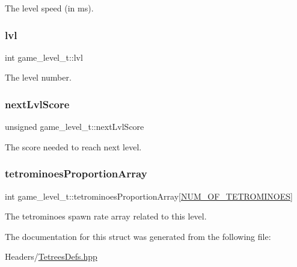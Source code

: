 The level speed (in ms). \mbox{\label{structgame__level__t_ab80383a9c51e3ad25cda4df0a7df8df2}} 
\subsubsection{\texorpdfstring{lvl}{lvl}}
{\footnotesize\ttfamily int game\+\_\+level\+\_\+t\+::lvl}

The level number. \mbox{\label{structgame__level__t_a9f5f86c9c90bebdd20950d74bf2dd450}} 
\subsubsection{\texorpdfstring{next\+Lvl\+Score}{nextLvlScore}}
{\footnotesize\ttfamily unsigned game\+\_\+level\+\_\+t\+::next\+Lvl\+Score}

The score needed to reach next level. \mbox{\label{structgame__level__t_abcef20ad8f4df7d270a4d5111ac8d85a}} 
\subsubsection{\texorpdfstring{tetrominoes\+Proportion\+Array}{tetrominoesProportionArray}}
{\footnotesize\ttfamily int game\+\_\+level\+\_\+t\+::tetrominoes\+Proportion\+Array\mbox{[}\hyperlink{TetreesDefs_8hpp_a69fa4aa1afe74f7f9ec42bf1e07ddf28}{N\+U\+M\+\_\+\+O\+F\+\_\+\+T\+E\+T\+R\+O\+M\+I\+N\+O\+ES}\mbox{]}}

The tetrominoes spawn rate array related to this level. 

The documentation for this struct was generated from the following file\+:\begin{DoxyCompactItemize}
\item 
Headers/\hyperlink{TetreesDefs_8hpp}{Tetrees\+Defs.\+hpp}\end{DoxyCompactItemize}
